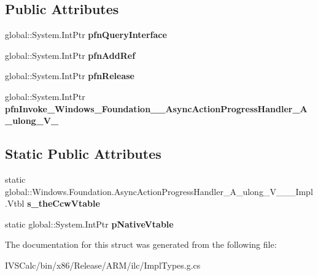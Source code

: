 \subsection*{Public Attributes}
\begin{DoxyCompactItemize}
\item 
\mbox{\label{struct_windows_1_1_foundation_1_1_async_action_progress_handler___a__ulong___v_______impl_1_1_vtbl_ac736fb7d89105c84800a6f3d81c97de8}} 
global\+::\+System.\+Int\+Ptr {\bfseries pfn\+Query\+Interface}
\item 
\mbox{\label{struct_windows_1_1_foundation_1_1_async_action_progress_handler___a__ulong___v_______impl_1_1_vtbl_a52767806be5d39b08f35fc17f295c463}} 
global\+::\+System.\+Int\+Ptr {\bfseries pfn\+Add\+Ref}
\item 
\mbox{\label{struct_windows_1_1_foundation_1_1_async_action_progress_handler___a__ulong___v_______impl_1_1_vtbl_a1e171de41075d81516d7a3aca0895b33}} 
global\+::\+System.\+Int\+Ptr {\bfseries pfn\+Release}
\item 
\mbox{\label{struct_windows_1_1_foundation_1_1_async_action_progress_handler___a__ulong___v_______impl_1_1_vtbl_a24967cd1fb2dfde1e8584d868b4da853}} 
global\+::\+System.\+Int\+Ptr {\bfseries pfn\+Invoke\+\_\+\+Windows\+\_\+\+Foundation\+\_\+\+\_\+\+Async\+Action\+Progress\+Handler\+\_\+\+A\+\_\+ulong\+\_\+\+V\+\_\+}
\end{DoxyCompactItemize}
\subsection*{Static Public Attributes}
\begin{DoxyCompactItemize}
\item 
\mbox{\label{struct_windows_1_1_foundation_1_1_async_action_progress_handler___a__ulong___v_______impl_1_1_vtbl_a833d26445e1e625eda692fe8ab0efd2d}} 
static global\+::\+Windows.\+Foundation.\+Async\+Action\+Progress\+Handler\+\_\+\+A\+\_\+ulong\+\_\+\+V\+\_\+\+\_\+\+\_\+\+Impl.\+Vtbl {\bfseries s\+\_\+the\+Ccw\+Vtable}
\item 
\mbox{\label{struct_windows_1_1_foundation_1_1_async_action_progress_handler___a__ulong___v_______impl_1_1_vtbl_a4cc9b0b74df0a4db493e1c15690ec01b}} 
static global\+::\+System.\+Int\+Ptr {\bfseries p\+Native\+Vtable}
\end{DoxyCompactItemize}


The documentation for this struct was generated from the following file\+:\begin{DoxyCompactItemize}
\item 
I\+V\+S\+Calc/bin/x86/\+Release/\+A\+R\+M/ilc/Impl\+Types.\+g.\+cs\end{DoxyCompactItemize}
